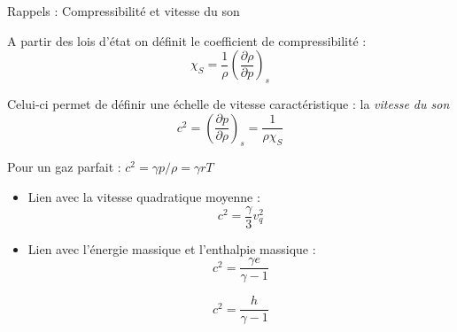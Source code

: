 \begin{frame}{Rappels : Compressibilité et vitesse du son} 

\small 

A partir des lois d'état on définit le coefficient de compressibilité :
$$
\chi_S = \frac{1}{\rho} \left(\frac{\partial \rho}{\partial p}\right)_{s}
$$
\pause

Celui-ci permet de définir une échelle de vitesse caractéristique : la {\em vitesse du son} 
$$
c^2 =  \left(\frac{\partial p}{\partial \rho}\right)_{s} = \frac{1}{\rho \chi_S}
$$

\pause
Pour un gaz parfait : $c^2 = \gamma p/\rho = \gamma r T$ 

\pause
\begin{itemize}
\item Lien avec la vitesse quadratique moyenne :
$$
c^2 = \frac{\gamma}{3} v_q^2
$$ 
\pause
\item Lien avec l'énergie massique et l'enthalpie massique :
$$
c^2 = \frac{\gamma e }{\gamma -1} 
$$

$$
c^2 = \frac{ h }{\gamma -1} 
$$



 \end{itemize}



 \end{frame}
 

